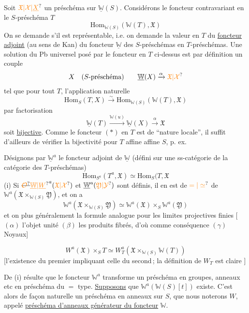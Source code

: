 Soit $\unsure{\mathfrak X|\mathcal X|\underline X}$ un préschéma sur $\underline{\mathbb W}(S)$. Considérons le foncteur contravariant en le $S$-préschéma $T$
\[
\mathrm{Hom}_{\mathbb W(S)}(\mathbb W(T),\mathfrak X)\tag*{(*)}
\]
On  se demande s'il est représentable, i.e. on demande la valeur en $T$ du \uline{foncteur adjoint} (au sens de Kan) du foncteur $\underline{\mathbb W}$ des $S$-préschémas en $T$-préschémas. Une solution du Pb universel posé par le foncteur en $T$ ci-dessus est par définition un couple
\[
 X\quad(S\text{-préschéma})\qquad \underline{\mathbb W}(X)\xrightarrow{\alpha}\unsure{\mathfrak X|\mathcal X}
\]
tel que pour tout $T$, l'application naturelle
\[
 \mathrm{Hom}_S(T,X)\xrightarrow{\sim}\mathrm{Hom}_{\mathbb W(S)}(\mathbb W(T),\mathfrak X)
\]
  par factorisation
\[
 \underline{\mathbb W}(T)\xrightarrow{\mathbb W(u)}\underline{\mathbb W}(X)\xrightarrow{\alpha}\mathfrak X
\]
soit \uline{bijective}. Comme le foncteur $(*)$ en $T$ est de ``nature locale'', il suffit d'ailleurs de vérifier la bijectivité pour $T$ affine   affine  $S$, p. ex.

Désignons par $\underline{\mathbb W}^a$ le foncteur adjoint de $\underline{\mathbb W}$ (défini sur une ss-catégorie de la catégorie des $T$-préschémas)
\[
 \mathrm{Hom}_{S^a}(T^a,\mathfrak X)\simeq\mathrm{Hom}_S(T,\mathfrak X
\]
(i) Si $\deleted{\unsure{\mathcal O}}\unsure{\underline{\mathbb W}|\underline W}^a(\unsure{\mathfrak X|\mathcal X})$ et $\underline{\mathbb W}^a(\unsure{\mathfrak Y|\mathcal Y})$ sont définis, il en est de $\unsure{=|\simeq}$ de $\mathbb W^a(\mathfrak X\times_{\mathbb W(S)}\mathfrak Y)$, et on a
\[
 \mathbb W^a(\mathfrak X\times_{\mathbb W(S)}\mathfrak Y)\simeq \mathbb W^a(\mathfrak X)\times_S \mathbb W^a(\mathfrak Y)
\]
et on  plus généralement  la formule analogue pour les limites projectives finies [ $(\alpha)$ l'objet unité $(\beta)$ les produits fibrés, d'où comme conséquence $(\gamma)$ Noyaux]

\[
 W^a(\mathfrak X)\times_S T\simeq W_T^a(\mathfrak X\times_{\mathbb W(S)}\mathbb W(T))\tag*{(ii)}
\]
[l'existence du premier  impliquant celle du second\,; la définition de $W_T$ est claire \unsure{\dots}]

De (i) résulte que le foncteur $\mathbb W^a$ transforme un préschéma en groupes, anneaux etc en préschéma du $=$ type.
\uline{Supposons} que $\mathbb W^a(\mathbb W(S)[t])$ existe. C'est alors de façon naturelle un préschéma en anneaux sur $S$, que nous noterons $W$, appelé \uline{préschéma d'anneaux générateur du foncteur} $\mathbb W$.

